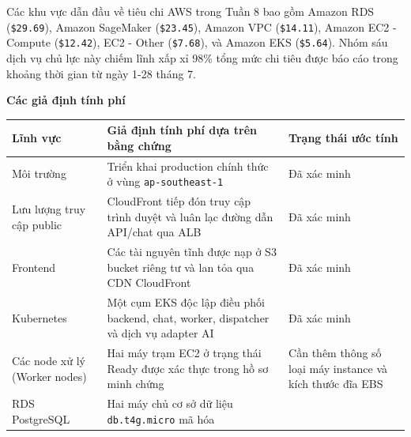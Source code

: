 Các khu vực dẫn đầu về tiêu chi AWS trong Tuần 8 bao gồm Amazon RDS
(\texttt{\$29.\allowbreak{}69}), Amazon SageMaker (\texttt{\$23.\allowbreak{}45}), Amazon VPC
(\texttt{\$14.\allowbreak{}11}), Amazon EC2 - Compute (\texttt{\$12.\allowbreak{}42}), EC2 - Other
(\texttt{\$7.\allowbreak{}68}), và Amazon EKS (\texttt{\$5.\allowbreak{}64}). Nhóm sáu dịch vụ chủ
lực này chiếm lĩnh xấp xỉ 98\% tổng mức chi tiêu được báo cáo trong
khoảng thời gian từ ngày 1-28 tháng 7.

\vspace{0.5em}\noindent\textbf{Các giả định tính
phí}\par

{
\begingroup
\small
\setlength{\tabcolsep}{3pt}
\renewcommand{\arraystretch}{1.15}
\begin{longtable}{@{}
  >{\raggedright\arraybackslash}p{}
  >{\raggedright\arraybackslash}p{}
  >{\raggedright\arraybackslash}p{}@{}}
\toprule\noalign{}
\begin{minipage}[b]{\linewidth}\raggedright
Lĩnh vực
\end{minipage} & \begin{minipage}[b]{\linewidth}\raggedright
Giả định tính phí dựa trên bằng chứng
\end{minipage} & \begin{minipage}[b]{\linewidth}\raggedright
Trạng thái ước tính
\end{minipage} \\
\midrule\noalign{}
\endhead
\bottomrule\noalign{}
\endlastfoot
Môi trường & Triển khai production chính thức ở vùng
\texttt{ap-\allowbreak{}southeast-\allowbreak{}1} & Đã xác minh \\
Lưu lượng truy cập public & CloudFront tiếp đón truy cập trình duyệt và
luân lạc đường dẫn API/chat qua ALB & Đã xác minh \\
Frontend & Các tài nguyên tĩnh được nạp ở S3 bucket riêng tư và lan tỏa
qua CDN CloudFront & Đã xác minh \\
Kubernetes & Một cụm EKS độc lập điều phối backend, chat, worker,
dispatcher và dịch vụ adapter AI & Đã xác minh \\
Các node xử lý (Worker nodes) & Hai máy trạm EC2 ở trạng thái Ready được
xác thực trong hồ sơ minh chứng & Cần thêm thông số loại máy instance và
kích thước đĩa EBS \\
RDS PostgreSQL & Hai máy chủ cơ sở dữ liệu \texttt{db.\allowbreak{}t4g.\allowbreak{}micro} mã hóa

\end{longtable}}
